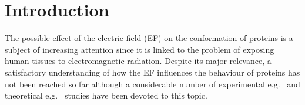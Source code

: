 \documentclass[a4paper,preprint,unsortedaddress,onecolumn]{revtex4-1}
\begin{document}
\maketitle


\section{Introduction}


The possible effect of the electric field (EF) on the conformation of
proteins is a subject of increasing attention since it is linked to the problem of exposing human tissues to
electromagnetic radiation. Despite its major relevance, a
satisfactory understanding of how the EF influences the behaviour of proteins
has not been reached so far although a considerable number of
experimental e.g.~\cite{bohr2000microwave, bohr2000microwave-1,
  dePomerai2000cell, inskip2001cellular, mancinelli2004non} and
theoretical e.g.~\cite{budi2005electric, budi2007effect,
  budi2008comparative, toschi2008effects, astrakas2011electric,
  astrakas2012structural, damm2012can, starzyk2013proteins,
  english2009nonequilibrium, solomentsev2012effects}
studies have been devoted to this topic.
\end{document}
